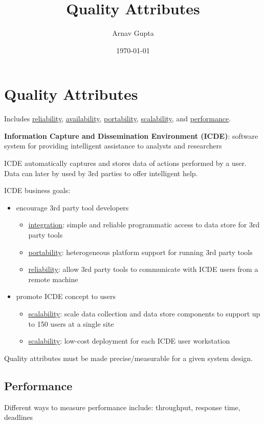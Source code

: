 \documentclass[11pt]{article}
\author{Arnav Gupta}
\date{\today}
\title{Quality Attributes}
\begin{document}
\maketitle
\tableofcontents

\section{Quality Attributes}
\label{sec:org2d61fed}
Includes \uline{reliability}, \uline{availability}, \uline{portability}, \uline{scalability},
and \uline{performance}.

\textbf{Information Capture and Dissemination Environment (ICDE)}: software system for
providing intelligent assistance to analysts and researchers

ICDE automatically captures and stores data of actions performed by a user.
Data can later by used by 3rd parties to offer intelligent help.

ICDE business goals:
\begin{itemize}
\item encourage 3rd party tool developers
\begin{itemize}
\item \uline{integration}: simple and reliable programmatic access to data store for
3rd party tools
\item \uline{portability}: heterogeneous platform support for running 3rd party
tools
\item \uline{reliability}: allow 3rd party tools to communicate with ICDE users from a
remote machine
\end{itemize}
\item promote ICDE concept to users
\begin{itemize}
\item \uline{scalability}: scale data collection and data store components to support
up to 150 users at a single site
\item \uline{scalability}: low-cost deployment for each ICDE user workstation
\end{itemize}
\end{itemize}

Quality attributes must be made precise/measurable for a given system design.
\subsection{Performance}
\label{sec:orgb90df7a}
Different ways to measure performance include: throughput, response time,
deadlines
\end{document}
